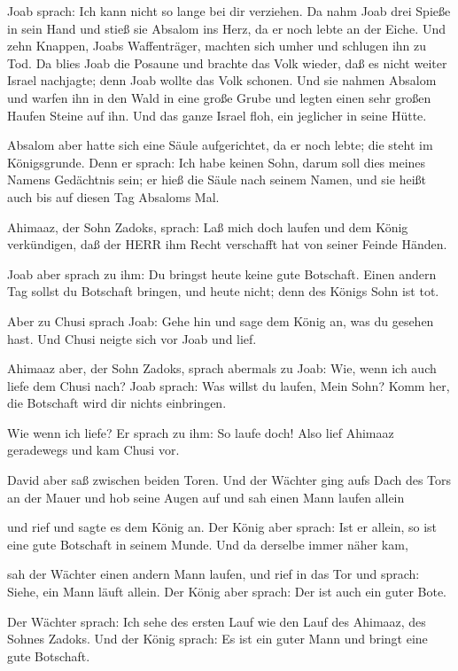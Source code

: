  Joab sprach: Ich kann nicht so lange bei dir verziehen. Da
nahm Joab drei Spieße in sein Hand und stieß sie Absalom ins Herz, da er
noch lebte an der Eiche.  Und zehn Knappen, Joabs
Waffenträger, machten sich umher und schlugen ihn zu Tod. 
Da blies Joab die Posaune und brachte das Volk wieder, daß es nicht
weiter Israel nachjagte; denn Joab wollte das Volk schonen.
 Und sie nahmen Absalom und warfen ihn in den Wald in eine
große Grube und legten einen sehr großen Haufen Steine auf ihn. Und das
ganze Israel floh, ein jeglicher in seine Hütte.

 Absalom aber hatte sich eine Säule aufgerichtet, da er
noch lebte; die steht im Königsgrunde. Denn er sprach: Ich habe keinen
Sohn, darum soll dies meines Namens Gedächtnis sein; er hieß die Säule
nach seinem Namen, und sie heißt auch bis auf diesen Tag Absaloms Mal.

 Ahimaaz, der Sohn Zadoks, sprach: Laß mich doch laufen und
dem König verkündigen, daß der HERR ihm Recht verschafft hat von seiner
Feinde Händen.

 Joab aber sprach zu ihm: Du bringst heute keine gute
Botschaft. Einen andern Tag sollst du Botschaft bringen, und heute
nicht; denn des Königs Sohn ist tot.

 Aber zu Chusi sprach Joab: Gehe hin und sage dem König an,
was du gesehen hast. Und Chusi neigte sich vor Joab und lief.

 Ahimaaz aber, der Sohn Zadoks, sprach abermals zu Joab:
Wie, wenn ich auch liefe dem Chusi nach? Joab sprach: Was willst du
laufen, Mein Sohn? Komm her, die Botschaft wird dir nichts einbringen.

 Wie wenn ich liefe? Er sprach zu ihm: So laufe doch! Also
lief Ahimaaz geradewegs und kam Chusi vor.

 David aber saß zwischen beiden Toren. Und der Wächter ging
aufs Dach des Tors an der Mauer und hob seine Augen auf und sah einen
Mann laufen allein

 und rief und sagte es dem König an. Der König aber sprach:
Ist er allein, so ist eine gute Botschaft in seinem Munde. Und da
derselbe immer näher kam,

 sah der Wächter einen andern Mann laufen, und rief in das
Tor und sprach: Siehe, ein Mann läuft allein. Der König aber sprach: Der
ist auch ein guter Bote.

 Der Wächter sprach: Ich sehe des ersten Lauf wie den Lauf
des Ahimaaz, des Sohnes Zadoks. Und der König sprach: Es ist ein guter
Mann und bringt eine gute Botschaft.


